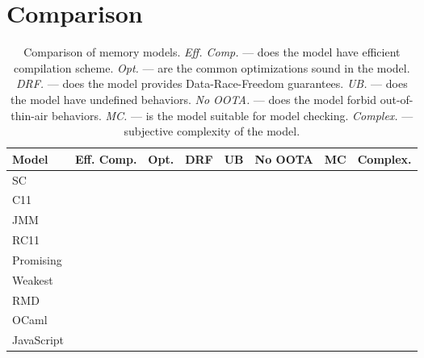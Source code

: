 \section{Comparison}

\begin{landscape}

\begin{table*}[t]
\centering
\begin{tabular}{ |l|c|c|c|c|c|c|c| }
                                                                            \hline

 Model          & Eff. Comp. & Opt. & DRF & UB & No OOTA & MC & Complex. \\ \hline

 SC             &            &      &     &    &         &    &          \\ \hline

 C11            &            &      &     &    &         &    &          \\ \hline

 JMM            &            &      &     &    &         &    &          \\ \hline

 RC11           &            &      &     &    &         &    &          \\ \hline

 Promising      &            &      &     &    &         &    &          \\ \hline

 Weakest        &            &      &     &    &         &    &          \\ \hline

 RMD            &            &      &     &    &         &    &          \\ \hline

 OCaml          &            &      &     &    &         &    &          \\ \hline

 JavaScript     &            &      &     &    &         &    &          \\ \hline

\end{tabular}
\caption{Comparison of memory models. 
  \textit{Eff. Comp.} --- does the model have efficient compilation scheme.
  \textit{Opt.} --- are the common optimizations sound in the model.
  \textit{DRF.} --- does the model provides Data-Race-Freedom guarantees.
  \textit{UB.} --- does the model have undefined behaviors.
  \textit{No OOTA.} --- does the model forbid out-of-thin-air behaviors.
  \textit{MC.} --- is the model suitable for model checking.
  \textit{Complex.} --- subjective complexity of the model.
}
\label{table:summary}
\end{table*}

\end{landscape}
